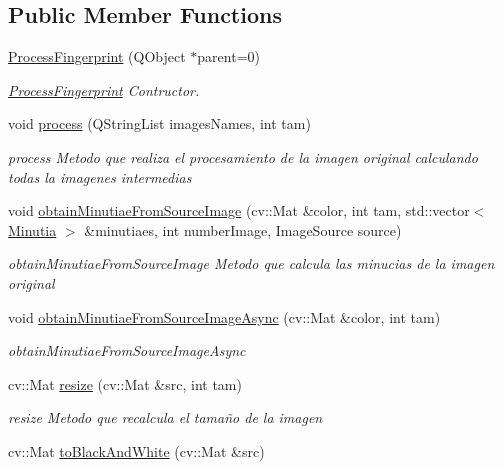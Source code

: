 \subsection*{Public Member Functions}
\begin{DoxyCompactItemize}
\item 
\hyperlink{class_process_fingerprint_ae2a1238e3736f8959eee3be36727f1f4}{Process\+Fingerprint} (Q\+Object $\ast$parent=0)
\begin{DoxyCompactList}\small\item\em \hyperlink{class_process_fingerprint}{Process\+Fingerprint} Contructor. \end{DoxyCompactList}\item 
void \hyperlink{class_process_fingerprint_a64482c12a72baede08336ce94a63ca06}{process} (Q\+String\+List images\+Names, int tam)
\begin{DoxyCompactList}\small\item\em process Metodo que realiza el procesamiento de la imagen original calculando todas la imagenes intermedias \end{DoxyCompactList}\item 
void \hyperlink{class_process_fingerprint_a64c17de334d4cb1c8193eb970abecffe}{obtain\+Minutiae\+From\+Source\+Image} (cv\+::\+Mat \&color, int tam, std\+::vector$<$ \hyperlink{class_minutia}{Minutia} $>$ \&minutiaes, int number\+Image, Image\+Source source)
\begin{DoxyCompactList}\small\item\em obtain\+Minutiae\+From\+Source\+Image Metodo que calcula las minucias de la imagen original \end{DoxyCompactList}\item 
void \hyperlink{class_process_fingerprint_a5e64ed1959421c4240c9281127d1d2fb}{obtain\+Minutiae\+From\+Source\+Image\+Async} (cv\+::\+Mat \&color, int tam)
\begin{DoxyCompactList}\small\item\em obtain\+Minutiae\+From\+Source\+Image\+Async \end{DoxyCompactList}\item 
cv\+::\+Mat \hyperlink{class_process_fingerprint_aa860148cdae1ab342c8e6c272a4bed64}{resize} (cv\+::\+Mat \&src, int tam)
\begin{DoxyCompactList}\small\item\em resize Metodo que recalcula el tamaño de la imagen \end{DoxyCompactList}\item 
cv\+::\+Mat \hyperlink{class_process_fingerprint_a7fc64b7aa73ddca798de4bf0ffed3794}{to\+Black\+And\+White} (cv\+::\+Mat \&src)

\end{DoxyCompactItemize}
